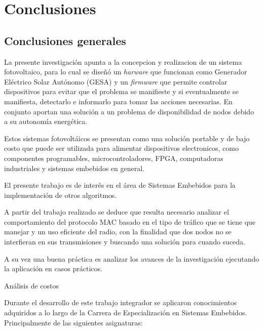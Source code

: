 
\chapter{Conclusiones} %

\label{Chapter5} %

\section{Conclusiones generales}

La presente investigación apunta a la concepcion y realizacion de un sistema fotovoltaico, para lo cual se diseñó un \textit{harware} que funcionan como Generador Eléctrico Solar Autónomo (GESA) y un \textit{firmware} que permite controlar dispositivos para evitar que el problema se manifieste y si eventualmente se manifiesta, detectarlo e informarlo para tomar las acciones necesarias. En conjunto aportan una solución a un problema de disponibilidad de nodos debido a su autonomía energética.

Estos sistemas fotovoltáicos se presentan como una solución portable y de bajo costo que puede ser utilizada para alimentar dispositivos electronicos, como componentes programables, microcontroladores, FPGA, computadoras industriales y sistemas embebidos en general.

El presente trabajo es de interés en el área de Sistemas Embebidos para la implementación de otros algoritmos.

A partir del trabajo realizado se deduce que resulta necesario analizar el comportamiento del protocolo MAC basado en el tipo de tráfico que se tiene que manejar y un uso eficiente del radio, con la finalidad que dos nodos no se interfieran en sus transmisiones y buscando una solución para cuando suceda.

A su vez una buena práctica es analizar los avances de la investigación ejecutando la aplicación en casos prácticos.

Análisis de costos

\medskip
Durante el desarrollo de este trabajo integrador se aplicaron conocimientos adquiridos a lo largo de la Carrera de Especialización en Sistemas Embebidos. Principalmente de las siguientes asignaturas: 


